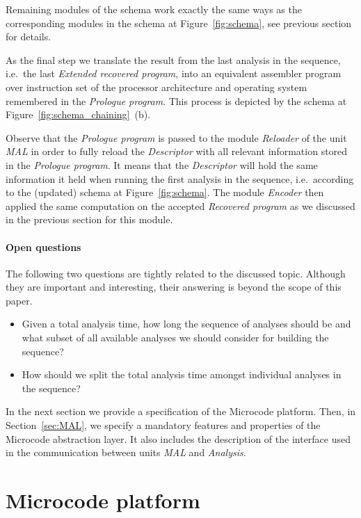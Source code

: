 \documentclass[10pt,twocolumn]{article}
\begin{document}
Remaining modules of the schema work exactly the same ways as the corresponding
modules in the schema at Figure~\ref{fig:schema}, see previous section for
details.

As the final step we translate the result from the last analysis in the
sequence, i.e.~the last \emph{Extended recovered program}, into an equivalent
assembler program over instruction set of the processor architecture and
operating system remembered in the \emph{Prologue program}. This process is
depicted by the schema at Figure~\ref{fig:schema_chaining}~(b).

Observe that the \emph{Prologue program} is passed to the module \emph{Reloader}
of the unit \emph{MAL} in order to fully reload the \emph{Descriptor} with all
relevant information stored in the \emph{Prologue program}. It means that the
\emph{Descriptor} will hold the same information it held when running the first
analysis in the sequence, i.e.~according to the (updated) schema at
Figure~\ref{fig:schema}. The module \emph{Encoder} then applied the same
computation on the accepted \emph{Recovered program} as we discussed in the
previous section for this module.

\paragraph{Open questions} %
The following two questions are tightly related to the discussed topic. Although
they are important and interesting, their answering is beyond the scope of this
paper.
\begin{itemize}
\item  Given a total analysis time, how long the sequence of analyses should be
and what subset of all available analyses we should consider for building the
sequence? %
\item How should we split the total analysis time amongst individual analyses in
the sequence? %
\end{itemize}

In the next section we provide a specification of the Microcode platform. Then,
in Section~\ref{sec:MAL}, we specify a mandatory features and
properties of the Microcode abstraction layer. It also includes the description
of the interface used in the communication between units \emph{MAL} and
\emph{Analysis}. 


\section{Microcode platform}
\label{sec:microcode}
\end{document}
